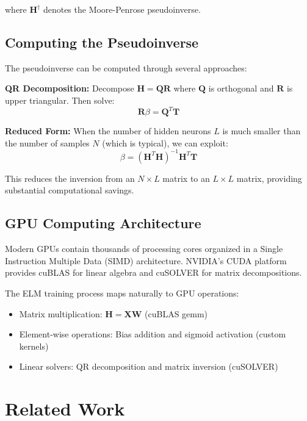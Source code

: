 \documentclass[conference]{IEEEtran}
\begin{document}
where $\mathbf{H}^{\dagger}$ denotes the Moore-Penrose pseudoinverse.

\subsection{Computing the Pseudoinverse}

The pseudoinverse can be computed through several approaches:

\textbf{QR Decomposition:} Decompose $\mathbf{H} = \mathbf{Q}\mathbf{R}$ where $\mathbf{Q}$ is orthogonal and $\mathbf{R}$ is upper triangular. Then solve:
\begin{equation}
\mathbf{R}\beta = \mathbf{Q}^T\mathbf{T}
\end{equation}

\textbf{Reduced Form:} When the number of hidden neurons $L$ is much smaller than the number of samples $N$ (which is typical), we can exploit:
\begin{equation}
\beta = (\mathbf{H}^T\mathbf{H})^{-1}\mathbf{H}^T\mathbf{T}
\label{eq:reduced}
\end{equation}

This reduces the inversion from an $N \times L$ matrix to an $L \times L$ matrix, providing substantial computational savings.

\subsection{GPU Computing Architecture}

Modern GPUs contain thousands of processing cores organized in a Single Instruction Multiple Data (SIMD) architecture. NVIDIA's CUDA platform provides cuBLAS for linear algebra and cuSOLVER for matrix decompositions.

The ELM training process maps naturally to GPU operations:
\begin{itemize}
\item Matrix multiplication: $\mathbf{H} = \mathbf{X}\mathbf{W}$ (cuBLAS gemm)
\item Element-wise operations: Bias addition and sigmoid activation (custom kernels)
\item Linear solvers: QR decomposition and matrix inversion (cuSOLVER)
\end{itemize}

\section{Related Work}
\label{sec:related}
\end{document}
